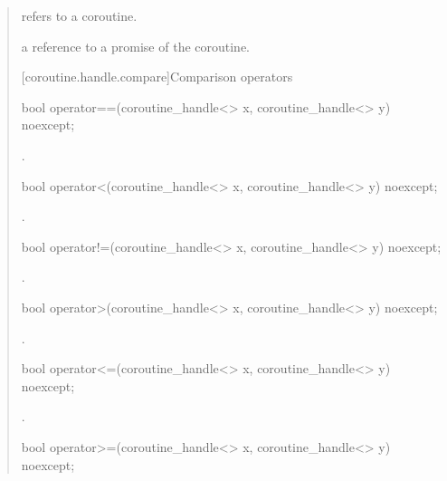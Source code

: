 \begin{quote}
\begin{itemdescr}
  \pnum
  \precondition {} refers to a coroutine.
  
  \pnum
  \returns a reference to a promise of the coroutine.
\end{itemdescr}

[coroutine.handle.compare]{Comparison operators}

\begin{itemdecl}
  bool operator==(coroutine_handle<> x, coroutine_handle<> y) noexcept;
\end{itemdecl}

\begin{itemdescr}
  \pnum
  \returns {}.
\end{itemdescr}

\begin{itemdecl}
  bool operator<(coroutine_handle<> x, coroutine_handle<> y) noexcept;
\end{itemdecl}

\begin{itemdescr}
  \pnum
  \returns {}.
\end{itemdescr}

\begin{itemdecl}
  bool operator!=(coroutine_handle<> x, coroutine_handle<> y) noexcept;
\end{itemdecl}

\begin{itemdescr}
  \pnum
  \returns {}.
\end{itemdescr}

\begin{itemdecl}
  bool operator>(coroutine_handle<> x, coroutine_handle<> y) noexcept;
\end{itemdecl}

\begin{itemdescr}
  \pnum
  \returns {}.
\end{itemdescr}

\begin{itemdecl}
  bool operator<=(coroutine_handle<> x, coroutine_handle<> y) noexcept;
\end{itemdecl}

\begin{itemdescr}
  \pnum
  \returns {}.
\end{itemdescr}

\begin{itemdecl}
  bool operator>=(coroutine_handle<> x, coroutine_handle<> y) noexcept;
\end{itemdecl}


\end{quote}
